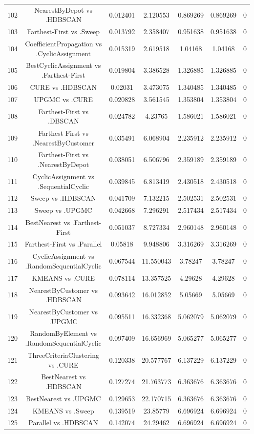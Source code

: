 \documentclass[a4paper,10pt]{article}
\begin{document}
\begin{landscape}
\begin{table}[!htp]
\begin{tabular}{ccccccc}
102&NearestByDepot vs .HDBSCAN&0.012401&2.120553&0.869269&0.869269&0\\
103&Farthest-First vs .Sweep&0.013792&2.358407&0.951638&0.951638&0\\
104&CoefficientPropagation vs .CyclicAssignment&0.015319&2.619518&1.04168&1.04168&0\\
105&BestCyclicAssignment vs .Farthest-First&0.019804&3.386528&1.326885&1.326885&0\\
106&CURE vs .HDBSCAN&0.02031&3.473075&1.340485&1.340485&0\\
107&UPGMC vs .CURE&0.020828&3.561545&1.353804&1.353804&0\\
108&Farthest-First vs .DBSCAN&0.024782&4.23765&1.586021&1.586021&0\\
109&Farthest-First vs .NearestByCustomer&0.035491&6.068904&2.235912&2.235912&0\\
110&Farthest-First vs .NearestByDepot&0.038051&6.506796&2.359189&2.359189&0\\
111&CyclicAssignment vs .SequentialCyclic&0.039845&6.813419&2.430518&2.430518&0\\
112&Sweep vs .HDBSCAN&0.041709&7.132215&2.502531&2.502531&0\\
113&Sweep vs .UPGMC&0.042668&7.296291&2.517434&2.517434&0\\
114&BestNearest vs .Farthest-First&0.051037&8.727334&2.960148&2.960148&0\\
115&Farthest-First vs .Parallel&0.05818&9.948806&3.316269&3.316269&0\\
116&CyclicAssignment vs .RandomSequentialCyclic&0.067544&11.550043&3.78247&3.78247&0\\
117&KMEANS vs .CURE&0.078114&13.357525&4.29628&4.29628&0\\
118&NearestByCustomer vs .HDBSCAN&0.093642&16.012852&5.05669&5.05669&0\\
119&NearestByCustomer vs .UPGMC&0.095511&16.332368&5.062079&5.062079&0\\
120&RandomByElement vs .RandomSequentialCyclic&0.097409&16.656969&5.065277&5.065277&0\\
121&ThreeCriteriaClustering vs .CURE&0.120338&20.577767&6.137229&6.137229&0\\
122&BestNearest vs .HDBSCAN&0.127274&21.763773&6.363676&6.363676&0\\
123&BestNearest vs .UPGMC&0.129653&22.170715&6.363676&6.363676&0\\
124&KMEANS vs .Sweep&0.139519&23.85779&6.696924&6.696924&0\\
125&Parallel vs .HDBSCAN&0.142074&24.29462&6.696924&6.696924&0\\

\end{tabular}
\end{table}
\end{landscape}
\end{document}
